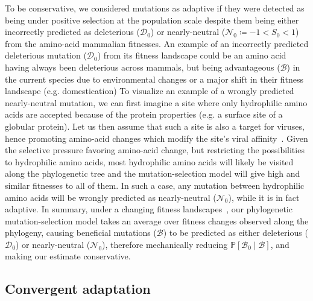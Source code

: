 \documentclass{article}
\newcommand{\proba}{\mathbb{P}}
\newcommand{\Sphy}{S_{0}}
\newcommand{\SphyDel}{\mathcal{D}_0}
\newcommand{\SphyNeu}{\mathcal{N}_0}
\newcommand{\SphyBen}{\mathcal{B}_0}
\newcommand{\given}{\mid}
\newcommand{\SpopBen}{\mathcal{B}}
\begin{document}
    To be conservative, we considered mutations as adaptive if they were detected as being under positive selection at the population scale despite them being either incorrectly predicted as deleterious ($\SphyDel$) or nearly-neutral ($\SphyNeu \coloneqq -1 < \Sphy <1$) from the amino-acid mammalian fitnesses.
    An example of an incorrectly predicted deleterious mutation ($\SphyDel$) from its fitness landscape could be an amino acid having always been deleterious across mammals, but being advantageous ($\SpopBen$) in the current species due to environmental changes or a major shift in their fitness landscape (e.g. domestication)
    To visualize an example of a wrongly predicted nearly-neutral mutation, we can first imagine a site where only hydrophilic amino acids are accepted because of the protein properties (e.g. a surface site of a globular protein).
    Let us then assume that such a site is also a target for viruses, hence promoting amino-acid changes which modify the site's viral affinity~\cite{enard_viruses_2016}.
    Given the selective pressure favoring amino-acid change, but restricting the possibilities to hydrophilic amino acids, most hydrophilic amino acids will likely be visited along the phylogenetic tree and the mutation-selection model will give high and similar fitnesses to all of them.
    In such a case, any mutation between hydrophilic amino acids will be wrongly predicted as nearly-neutral ($\SphyNeu$), while it is in fact adaptive.
    In summary, under a changing fitness landscapes~\cite{mustonen_molecular_2008}, our phylogenetic mutation-selection model takes an average over fitness changes observed along the phylogeny, causing beneficial mutations ($\SpopBen$) to be predicted as either deleterious ($\SphyDel$) or nearly-neutral ($\SphyNeu$), therefore mechanically reducing $\proba [ \SphyBen \given \SpopBen]$, and making our estimate conservative.

    \subsection*{Convergent adaptation}
\end{document}
